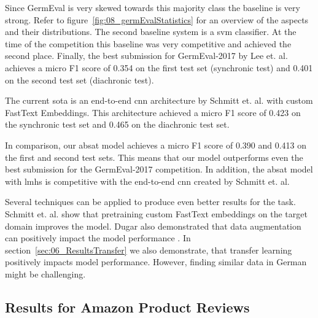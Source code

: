 Since GermEval is very skewed towards this majority class the baseline is very strong. Refer to figure~\ref{fig:08_germEvalStatistics} for an overview of the aspects and their distributions. The second baseline system is a \gls{svm} classifier. At the time of the competition this baseline was very competitive and achieved the second place. Finally, the best submission for GermEval-2017 by Lee et. al. achieves a micro F1 score of 0.354 on the first test set {(synchronic test)} and 0.401 on the second test set {(diachronic test)}.
\medskip

The current \acrfull{sota} is an end-to-end \gls{cnn} architecture by Schmitt et. al. \cite{Schmitt2018} with custom FastText Embeddings. This architecture achieved a micro F1 score of 0.423 on the synchronic test set and 0.465 on the diachronic test set. 
\medskip

In comparison, our \gls{absat} model achieves a micro F1 score of 0.390 and 0.413 on the first and second test sets. This means that our model outperforms even the best submission for the GermEval-2017 competition. In addition, the \gls{absat} model with \glspl{lmh} is competitive with the end-to-end \gls{cnn} created by Schmitt et. al.
\medskip

Several techniques can be applied to produce even better results for the task. Schmitt et. al. show that pretraining custom FastText embeddings on the target domain improves the model. Dugar also demonstrated that data augmentation can positively impact the model performance \cite{Dugar2019}. 
\smallskip
In section~\ref{sec:06_ResultsTransfer} we also demonstrate, that transfer learning positively impacts model performance. However, finding similar data in German might be challenging.

\subsection{Results for Amazon Product Reviews}
\label{sec:06_ResultsAmazon}

